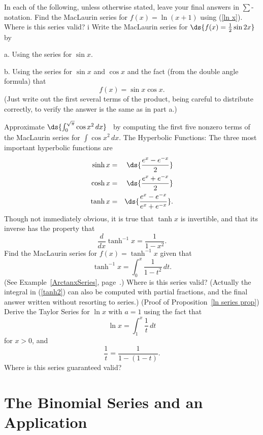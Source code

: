 \noindent In each of the following, unless otherwise stated, leave
your final answers in $\sum$-notation.
\bhw Find the MacLaurin series for $f(x)=\ln(x+1)$ using
(\ref{ln x}).  Where is this series valid?  
i%
\ehw
\bhw Write the MacLaurin series for $\ds{f(x)=\frac12\sin2x}$
by\begin{description}
\item a.  Using the series for $\sin x$.
\item b. Using the series for $\sin x$ and $\cos x$ and the fact
(from the double angle formula) that
$$f(x)=\sin x\cos x.$$
(Just write out the first several terms of the product, being
careful to distribute correctly, to verify the answer is the
same as in part a.) 
\end{description}\ehw
\bhw Approximate $\ds{\int_0^{\sqrt\pi}\cos x^2\,dx}$ \ by computing
the first five nonzero terms of the MacLaurin series for $\int\cos x^2\,dx$.
\ehw
\bhw
 The Hyperbolic Functions:  The three most important hyperbolic
functions are
\begin{eqnarray}
\sinh x&=&\ds{\frac{e^x-e^{-x}}2}\\
\cosh x&=&\ds{\frac{e^x+e^{-x}}2}\\
\tanh x&=&\ds{\frac{e^x-e^{-x}}{e^x+e^{-x}}}.\end{eqnarray} 
Though not immediately obvious, it is true that $\tanh x$ is
invertible, and that its inverse has the property that
\begin{equation}\frac{d}{dx}\tanh^{-1}x=\frac1{1-x^2}.\end{equation}
Find the MacLaurin series for $f(x)=\tanh^{-1}x$ given that
\begin{equation}\tanh^{-1}x=\int_0^x\frac1{1-t^2}\,dt.\label{tanh2}
\end{equation}
(See Example~\ref{ArctanxSeries}, page~\pageref{ArctanxSeries}.)  
Where is this series valid? (Actually the integral
in (\ref{tanh2}) can also be computed with partial fractions, and
the final answer  written without resorting to series.)
\label{HyperbolicFunctsMaclaurinSeries}\ehw
\bhw (Proof of  Proposition~\ref{ln series prop})
Derive the Taylor Series for $\ln x$ with $a=1$ using the fact that
$$\ln x=\int_1^x\frac1t\,dt$$
for $x>0$, and 
$$\frac1t=\frac1{1-(1-t)}.$$
Where is this series guaranteed valid?
\ehw

\section{The Binomial Series and an Application}

